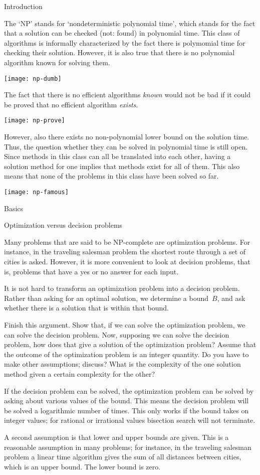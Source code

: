  {Introduction}

The `NP' stands for `nondeterministic polynomial time', which stands
for the fact that a solution can be checked (not: found) in polynomial
time.  This class of algorithms is informally characterized by the
fact there is polymomial time for checking their solution.
However, it is also true
that there is no polynomial algorithm known for solving them.

\texttt{[image: np-dumb]}

The fact that there is no efficient algorithms \emph{known} would not
be bad if it could be proved that no efficient algorithm
\emph{exists}.

\texttt{[image: np-prove]}

However,
also there exists no non-polynomial lower bound on the solution
time. Thus, the question whether they can be solved in polynomial time
is still open. 
Since methods in this class can all be translated into
each other, having a solution method for one implies that methods
exist for all of them. This also means that none of the problems in
this class have been solved so far.

\texttt{[image: np-famous]}


 {Basics}

 {Optimization versus decision problems}

Many problems that are said to be NP-complete are optimization
problems. For instance, in the traveling salesman problem the shortest
route through a set of cities is asked. However, it is more convenient
to look at decision problems, that is, problems that have a yes or no
answer for each input.

It is not hard to transform an optimization problem into a decision
problem. Rather than asking for an optimal solution, we determine a
bound~$B$, and ask whether there is a solution that is within that
bound.
\begin{594exercise}
Finish this argument. Show that, if we can solve the optimization
problem, we can solve the decision problem. 
Now, supposing we can solve the decision problem, how
does that give a solution of the optimization problem? Assume that the
outcome of the optimization problem is an integer quantity. Do you
have to make other assumptions; discuss? What is
the complexity of the one solution method given a certain complexity
for the other?
\end{594exercise}
\begin{answer}
If the decision problem can be solved, the optimization problem can be
solved by asking about various values of the bound. This means the
decision problem will be solved a logarithmic number of times.
This only works if the bound takes on integer values; for rational or
irrational values bisection search will not terminate.

A second assumption is that lower and upper bounds are given. This is 
a reasonable assumption in many problems; for instance, in the
traveling salesman problem a linear time algorithm gives the sum of
all distances between cities, which is an upper bound. The lower bound
is zero.
\end{answer}

